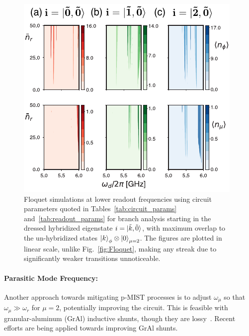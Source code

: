 \documentclass[%
reprint,
superscriptaddress,
 amsmath,amssymb,
 aps,
 prx,
longbibliography,
floatfix,
]{revtex4-2}
\newcommand{\singh}[1]{{\color{orange}{{}#1}}}%
\begin{document}
\begin{figure}[htb]
    \centering
    \includegraphics[width=\linewidth]{Figures/Floquet_low.pdf}
    \caption{Floquet simulations at lower readout frequencies using circuit parameters quoted in Tables~\ref{tab:circuit_params} and~\ref{tab:readout_params} for branch analysis starting in the dressed hybridized eigenstate $i=\ket{\tilde{k},\tilde{0}}$, with maximum overlap to the un-hybridized states $\ket{k}_\phi\otimes\ket{0}_{\mu=2}$. The figures are plotted in linear scale, unlike Fig.~\ref{fig:Floquet}, making any streak due to significantly weaker transitions \singh{($\Delta_{ac}<1$ KHz)} unnoticeable.}
    \label{fig:Flo_low}
\end{figure}

\paragraph{Parasitic Mode Frequency:}
Another approach towards mitigating p-MIST processes is to adjust $\omega_\mu$ so that $\omega_\mu \gg\omega_r$ for $\mu=2$, potentially improving the circuit. This is feasible with granular-aluminum (GrAl) inductive shunts, though they are lossy~\cite{gusenkova2021quantum}. Recent efforts are being applied towards improving GrAl shunts. 
\end{document}
